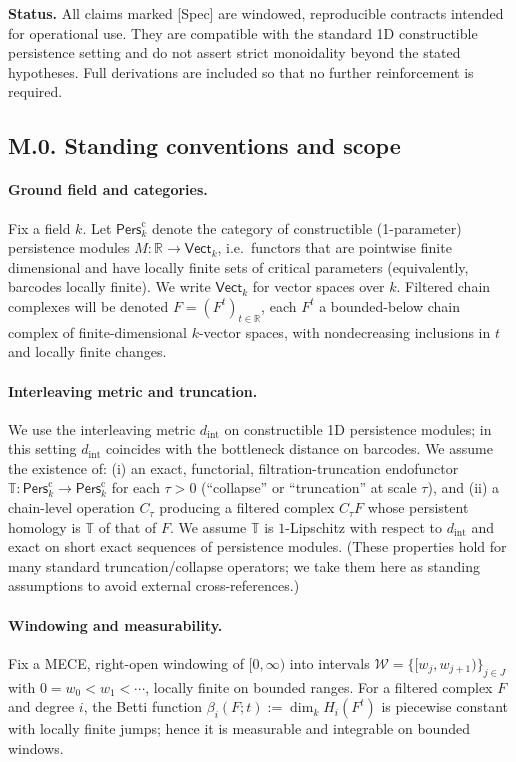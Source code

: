 \documentclass[11pt]{article}
\numberwithin{equation}{section}
\theoremstyle{plain}
\theoremstyle{definition}
\theoremstyle{remark}
\newcommand{\RR}{\mathbb{R}}
\newcommand{\TT}{\mathbb{T}}
\newcommand{\Pers}{\mathsf{Pers}}
\newcommand{\Vect}{\mathsf{Vect}}
\theoremstyle{plain}
\theoremstyle{definition}
\newcommand{\kk}{k}
\newcommand{\betti}{\beta}
\newcommand{\CT}{C_{\tau}}
\newcommand{\dint}{d_{\mathrm{int}}}
\numberwithin{equation}{section}
\theoremstyle{definition}
\numberwithin{equation}{section}
\theoremstyle{plain}
\theoremstyle{definition}
\theoremstyle{remark}
\begin{document}
\bigskip

\noindent
\textbf{Status.} All claims marked [Spec] are windowed, reproducible contracts intended for operational use. They are compatible with the standard 1D constructible persistence setting and do not assert strict monoidality beyond the stated hypotheses. Full derivations are included so that no further reinforcement is required.

\subsection*{M.0. Standing conventions and scope}

\paragraph{Ground field and categories.}
Fix a field \(\kk\).
Let \(\Pers^\mathrm{c}_\kk\) denote the category of constructible (1-parameter) persistence modules \(M:\RR\to\Vect_\kk\), i.e.\ functors that are pointwise finite dimensional and have locally finite sets of critical parameters (equivalently, barcodes locally finite).
We write \(\Vect_\kk\) for vector spaces over \(\kk\).
Filtered chain complexes will be denoted \(F=(F^t)_{t\in\RR}\), each \(F^t\) a bounded-below chain complex of finite-dimensional \(\kk\)-vector spaces, with nondecreasing inclusions in \(t\) and locally finite changes.

\paragraph{Interleaving metric and truncation.}
We use the interleaving metric \(\dint\) on constructible 1D persistence modules; in this setting \(\dint\) coincides with the bottleneck distance on barcodes.
We assume the existence of:
(i) an exact, functorial, filtration-truncation endofunctor \(\TT:\Pers^\mathrm{c}_\kk\to\Pers^\mathrm{c}_\kk\) for each \(\tau>0\) (``collapse'' or ``truncation'' at scale \(\tau\)), and
(ii) a chain-level operation \(\CT\) producing a filtered complex \(\CT F\) whose persistent homology is \(\TT\) of that of \(F\).
We assume \(\TT\) is \(1\)-Lipschitz with respect to \(\dint\) and exact on short exact sequences of persistence modules.
(These properties hold for many standard truncation/collapse operators; we take them here as standing assumptions to avoid external cross-references.)

\paragraph{Windowing and measurability.}
Fix a MECE, right-open windowing of \([0,\infty)\) into intervals \(\mathcal{W}=\{[w_j,w_{j+1})\}_{j\in J}\) with \(0=w_0<w_1<\cdots\), locally finite on bounded ranges.
For a filtered complex \(F\) and degree \(i\), the Betti function \(\betti_i(F;t):=\dim_\kk H_i(F^t)\) is piecewise constant with locally finite jumps; hence it is measurable and integrable on bounded windows.
\end{document}
